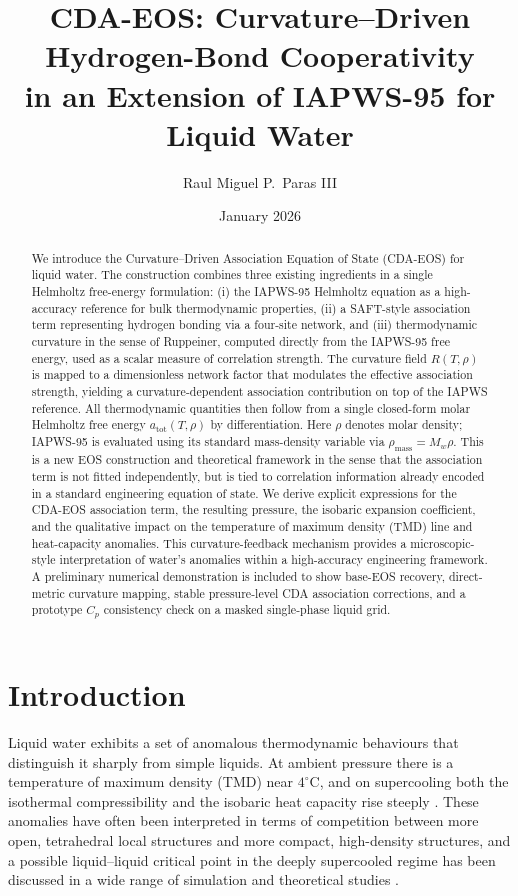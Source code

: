\documentclass[12pt]{article}
\title{CDA-EOS: Curvature--Driven Hydrogen-Bond Cooperativity\\
in an Extension of IAPWS-95 for Liquid Water}
\author{Raul Miguel P.\ Paras III}
\date{January 2026}
\begin{document}
\maketitle

\begin{abstract}
We introduce the Curvature--Driven Association Equation of State (CDA-EOS) for liquid water. The construction combines three existing ingredients in a single Helmholtz free-energy formulation: (i) the IAPWS-95 Helmholtz equation as a high-accuracy reference for bulk thermodynamic properties, (ii) a SAFT-style association term representing hydrogen bonding via a four-site network, and (iii) thermodynamic curvature in the sense of Ruppeiner, computed directly from the IAPWS-95 free energy, used as a scalar measure of correlation strength. The curvature field $R(T,\rho)$ is mapped to a dimensionless network factor that modulates the effective association strength, yielding a curvature-dependent association contribution on top of the IAPWS reference. All thermodynamic quantities then follow from a single closed-form molar Helmholtz free energy $a_{\mathrm{tot}}(T,\rho)$ by differentiation. Here $\rho$ denotes molar density; IAPWS-95 is evaluated using its standard mass-density variable via $\rho_{\mathrm{mass}}=M_w\rho$. This is a new EOS construction and theoretical framework in the sense that the association term is not fitted independently, but is tied to correlation information already encoded in a standard engineering equation of state. We derive explicit expressions for the CDA-EOS association term, the resulting pressure, the isobaric expansion coefficient, and the qualitative impact on the temperature of maximum density (TMD) line and heat-capacity anomalies. This curvature-feedback mechanism provides a microscopic-style interpretation of water's anomalies within a high-accuracy engineering framework. A preliminary numerical demonstration is included to show base-EOS recovery, direct-metric curvature mapping, stable pressure-level CDA association corrections, and a prototype $C_p$ consistency check on a masked single-phase liquid grid.
\end{abstract}

\section{Introduction}

Liquid water exhibits a set of anomalous thermodynamic behaviours that distinguish it sharply from simple liquids. At ambient pressure there is a temperature of maximum density (TMD) near $4^{\circ}$C, and on supercooling both the isothermal compressibility and the isobaric heat capacity rise steeply \cite{Speedy1987,IAPWS15}. These anomalies have often been interpreted in terms of competition between more open, tetrahedral local structures and more compact, high-density structures, and a possible liquid--liquid critical point in the deeply supercooled regime has been discussed in a wide range of simulation and theoretical studies \cite{IAPWS15,Holten2014}.
\end{document}
